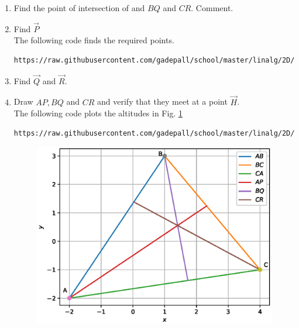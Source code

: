 \documentclass[journal,12pt,twocolumn]{IEEEtran}
\renewcommand\thesection{\arabic{section}}
\begin{document}
\begin{enumerate}[label=\thesection.\arabic*
,ref=\thesection.\theenumi]
\item Find the point of intersection of  and $BQ$ and $CR$. Comment.
\item Find $\vec{P}$
%
\\
\solution The following code finds the required points.
\begin{lstlisting}
https://raw.githubusercontent.com/gadepall/school/master/linalg/2D/python_2d/codes/alt_foot.py
\end{lstlisting}
\item Find $\vec{Q}$ and $\vec{R}$.
\item Draw $AP, BQ$ and $CR$ and verify that they meet at a point 
$\vec{H}$.  
\\
\solution The following code plots the altitudes in Fig. \ref{fig:alt_triangle}
\begin{lstlisting}
https://raw.githubusercontent.com/gadepall/school/master/linalg/2D/python_2d/codes/alt_draw.py
\end{lstlisting}
\begin{figure}
\centering
\includegraphics[width=\columnwidth]{./figs/alt_triangle.eps}
\caption{}
\label{fig:alt_triangle}
\end{figure}

\end{enumerate}
\end{document}
